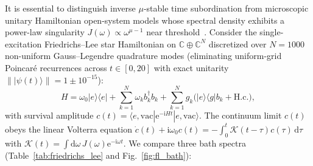 \documentclass[twocolumn,10pt,amsmath,amssymb,floatfix]{revtex4-2}
\theoremstyle{plain}
\theoremstyle{definition}
\newcommand{\dd}{\mathrm{d}}
\newcommand{\ii}{\mathrm{i}}
\newcommand{\ee}{\mathrm{e}}
\begin{document}
It is essential to distinguish inverse $\mu$-stable time subordination from microscopic unitary Hamiltonian open-system models whose spectral density exhibits a power-law singularity $J(\omega) \propto \omega^{\mu-1}$ near threshold~\cite{Friedrichs1948CPAM,Lee1954PR,Garraway1997PRA}. Consider the single-excitation Friedrichs--Lee star Hamiltonian on $\mathbb{C} \oplus \mathbb{C}^N$ discretized over $N = 1000$ non-uniform Gauss--Legendre quadrature modes (eliminating uniform-grid Poincar\'e recurrences across $t \in [0, 20]$ with exact unitarity $\| |\psi(t)\rangle \| = 1 \pm 10^{-15}$):
\begin{equation}
\label{eq:fl_ham}
H = \omega_0 |e\rangle\langle e| + \sum_{k=1}^{N} \omega_k b_k^\dagger b_k + \sum_{k=1}^{N} g_k\big(|e\rangle\langle g|b_k + \mathrm{H.c.}\big),
\end{equation}
with survival amplitude $c(t) = \langle e, \mathrm{vac}| \ee^{-\ii H t} |e, \mathrm{vac}\rangle$. The continuum limit $c(t)$ obeys the linear Volterra equation $\dot{c}(t) + \ii\omega_0 c(t) = -\int_0^t \mathcal{K}(t-\tau) c(\tau)\,\dd\tau$ with $\mathcal{K}(t) = \int \dd\omega\, J(\omega) \ee^{-\ii\omega t}$. We compare three bath spectra (Table~\ref{tab:friedrichs_lee} and Fig.~\ref{fig:fl_bath}):
\end{document}
